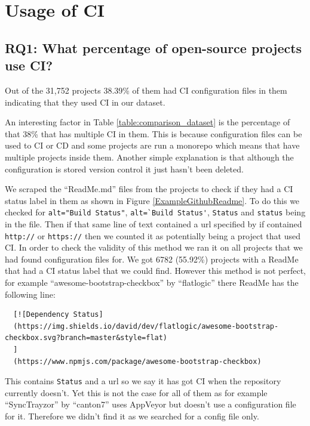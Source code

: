\documentclass[twoside,12pt,titlepage,a4paper]{article}
\begin{document}
\pagebreak
\section{Usage of CI}

\vspace*{-0.05in}
\subsection{\textbf{RQ1}: What percentage of open-source projects use CI?}
\label{section:RQ1}
\vspace*{-0.05in}

Out of the 31,752 projects 38.39\% of them had CI configuration files in them indicating that they used CI in our dataset. 


An interesting factor in Table \ref{table:comparison_dataset} is the percentage of that 38\% that has multiple CI in them. This is because configuration files can be used to CI or CD and some projects are run a monorepo which means that have multiple projects inside them. Another simple explanation is that although the configuration is stored version control it just hasn't been deleted. 

We scraped the \enquote{ReadMe.md} files from the projects to check if they had a CI status label in them as shown in Figure \ref{ExampleGithubReadme}. To do this we checked for \verb|alt="Build Status"|, \verb|alt=`Build Status'|, \verb|Status| and \verb|status| being in the file. Then if that same line of text contained a url specified by if contained \verb|http://| or \verb|https://| then we counted it as potentially being a project that used CI. In order to check the validity of this method we ran it on all projects that we had found configuration files for. We got 6782 (55.92\%) projects with a ReadMe that had a CI status label that we could find.
However this method is not perfect, for example \enquote{awesome-bootstrap-checkbox} by \enquote{flatlogic} \cite{GithubReadMeIncorrectFind} there ReadMe has the following line:
\begin{verbatim}
  [![Dependency Status]
  (https://img.shields.io/david/dev/flatlogic/awesome-bootstrap-checkbox.svg?branch=master&style=flat)
  ]
  (https://www.npmjs.com/package/awesome-bootstrap-checkbox) 
\end{verbatim}
This contains \verb|Status| and a url so we say it has got CI when the repository currently doesn't. Yet this is not the case for all of them as for example \enquote{SyncTrayzor} by \enquote{canton7} \cite{Male2020} uses AppVeyor but doesn't use a configuration file for it. Therefore we didn't find it as we searched for a config file only. 
\end{document}
